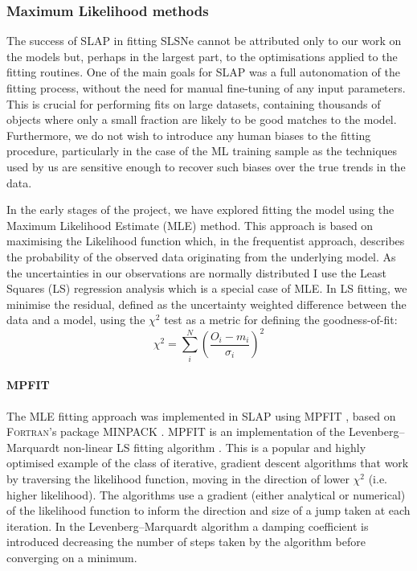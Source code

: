 \subsubsection{Maximum Likelihood methods}
The success of \textsc{SLAP} in fitting SLSNe cannot be attributed only to our work on the models but, perhaps in the largest part, to the optimisations applied to the fitting routines. One of the main goals for \textsc{SLAP} was a full autonomation of the fitting process, without the need for manual fine-tuning of any input parameters. This is crucial for performing fits on large datasets, containing thousands of objects where only a small fraction are likely to be good matches to the model. Furthermore, we do not wish to introduce any human biases to the fitting procedure, particularly in the case of the ML training sample as the techniques used by us are sensitive enough to recover such biases over the true trends in the data.

In the early stages of the project, we have explored fitting the model using the Maximum Likelihood Estimate (MLE) method. This approach is based on maximising the Likelihood function which, in the frequentist approach, describes the probability of the observed data originating from the underlying model. As the uncertainties in our observations are normally distributed I use the Least Squares (LS) regression analysis which is a special case of MLE. In LS fitting, we minimise the residual, defined as the uncertainty weighted difference between the data and a model, using the $\chi^{2}$ test as a metric for defining the goodness-of-fit:
\begin{equation}
  \chi^2 = \sum\limits_i^N \left( \frac{O_i - m_i}{\sigma_i} \right)^2
\end{equation}

\paragraph{MPFIT} \label{sec:MPFIT}
The MLE fitting approach was implemented in \textsc{SLAP} using \textsc{MPFIT} \citep{ Markwardt2008}, based on \textsc{Fortran}'s package \textsc{MINPACK} \citep{More1980}. \textsc{MPFIT} is an implementation of the Levenberg–Marquardt non-linear LS fitting algorithm \citep{Levenberg1944,Marquardt1963}. This is a popular and highly optimised example of the class of iterative, gradient descent algorithms that work by traversing the likelihood function, moving in the direction of lower $\chi^2$ (i.e. higher likelihood). The algorithms use a gradient (either analytical or numerical) of the likelihood function to inform the direction and size of a jump taken at each iteration. In the Levenberg–Marquardt algorithm a damping coefficient is introduced decreasing the number of steps taken by the algorithm before converging on a minimum.

